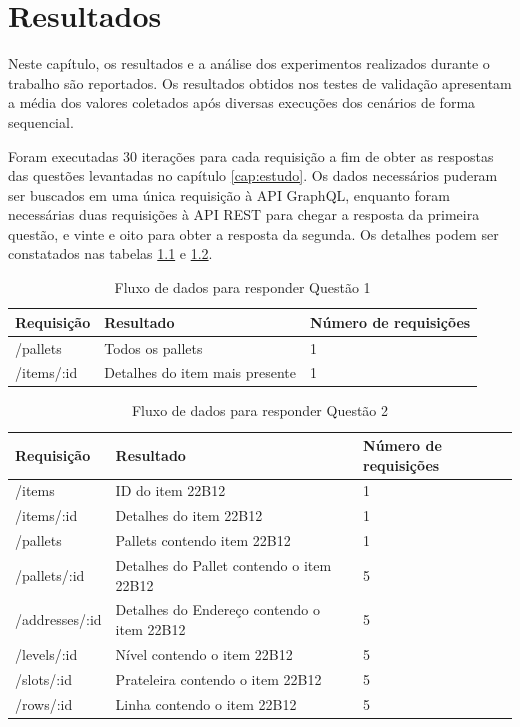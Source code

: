 \chapter{Resultados}

Neste capítulo, os resultados e a análise dos experimentos realizados durante o trabalho são reportados. Os resultados obtidos nos testes de validação apresentam a média dos valores coletados após diversas execuções dos cenários de forma sequencial.

Foram executadas 30 iterações para cada requisição a fim de obter as respostas das questões levantadas no capítulo \ref{cap:estudo}. Os dados necessários puderam ser buscados em uma única requisição à API GraphQL, enquanto foram necessárias duas requisições à API REST para chegar a resposta da primeira questão, e vinte e oito para obter a resposta da segunda. Os detalhes podem ser constatados nas tabelas \ref{tab:request-table1} e \ref{tab:request-table2}.

\begin{table}[htbp]
    \centering
    \begin{tabular}{| l | l | l |}
        \hline
        \textbf{Requisição} & \textbf{Resultado} & \textbf{Número de requisições} \\ \hline
        /pallets & Todos os pallets & 1 \\ \hline
        /items/:id & Detalhes do item mais presente & 1 \\ \hline
    \end{tabular}
    \caption{Fluxo de dados para responder Questão 1} 
    \label{tab:request-table1}
\end{table}

\begin{table}[htbp]
    \centering
    \begin{tabular}{| l | l | l |}
        \hline
        \textbf{Requisição} & \textbf{Resultado} & \textbf{Número de requisições} \\ \hline
        /items & ID do item 22B12 & 1 \\ \hline
        /items/:id & Detalhes do item 22B12 & 1 \\ \hline
        /pallets & Pallets contendo item 22B12 & 1 \\ \hline
        /pallets/:id & Detalhes do Pallet contendo o item 22B12 & 5 \\ \hline
        /addresses/:id & Detalhes do Endereço contendo o item 22B12 & 5 \\ \hline
        /levels/:id & Nível contendo o item 22B12 & 5 \\ \hline
        /slots/:id & Prateleira contendo o item 22B12 & 5  \\ \hline
        /rows/:id & Linha contendo o item 22B12 & 5 \\ \hline
    \end{tabular}
    \caption{Fluxo de dados para responder Questão 2} 
    \label{tab:request-table2}
\end{table}

